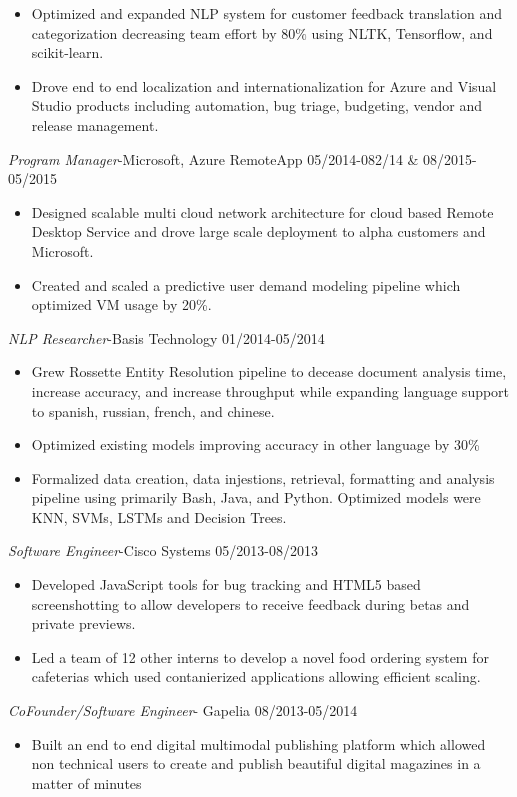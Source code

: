 \documentclass[line,margin]{res}
\begin{document}
\begin{resume}
\begin{itemize}
\item Optimized and expanded NLP system for customer feedback translation and categorization decreasing team effort by $80\%$ using NLTK, Tensorflow, and scikit-learn.
\item Drove end to end localization and internationalization for Azure and Visual Studio products including automation, bug triage, budgeting, vendor and release management.
\end{itemize}
{\sl Program Manager}-Microsoft, Azure RemoteApp  \hfill 05/2014-082/14 \& 08/2015-05/2015
\begin{itemize}  \itemsep -4pt
\item Designed scalable multi cloud network architecture for cloud based Remote Desktop Service and drove large scale deployment to alpha customers and Microsoft.
\item Created and scaled a predictive user demand modeling pipeline which optimized VM usage by 20\%.
\end{itemize}
{\sl NLP Researcher}-Basis Technology \hfill 01/2014-05/2014
\begin{itemize}  \itemsep -4pt
\item Grew Rossette Entity Resolution pipeline to decease document analysis time, increase accuracy, and increase throughput while expanding language support to spanish, russian, french, and chinese.
\item Optimized existing models improving accuracy in other language by 30\%
\item Formalized data creation, data injestions, retrieval, formatting and analysis pipeline using primarily Bash, Java, and Python. Optimized models were KNN, SVMs, LSTMs and Decision Trees.
\end{itemize}
{\sl Software Engineer}-Cisco Systems \hfill 05/2013-08/2013
\begin{itemize}  \itemsep -4pt
\item Developed JavaScript tools for bug tracking and HTML5 based screenshotting to allow developers to receive feedback during betas and private previews. 
\item Led a team of 12 other interns to develop a novel food ordering system for cafeterias which used contanierized applications allowing efficient scaling.
\end{itemize}
{\sl CoFounder/Software Engineer}- Gapelia \hfill 08/2013-05/2014
\begin{itemize}  \itemsep -4pt
\item Built an end to end digital multimodal publishing platform which allowed non technical users to create and publish beautiful digital magazines in a matter of minutes

\end{itemize}
\end{resume}
\end{document}
